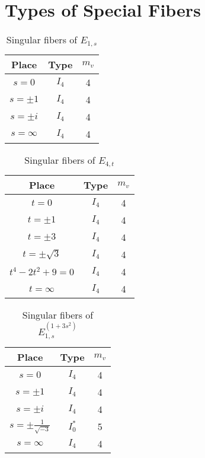 \documentclass[main]{subfiles}
\begin{document}
\chapter{Types of Special Fibers}
\begin{table}[h]
    \centering
    \caption{Singular fibers of $E_{1,s}$}
    \begin{tabular}{|c|c|c|}
        \hline
        Place      & Type  & $m_v$ \\
        \hline
        $s=0$      & $I_4$ & 4     \\
        $s=\pm 1$  & $I_4$ & 4     \\
        $s=\pm i$  & $I_4$ & 4     \\
        $s=\infty$ & $I_4$ & 4     \\
        \hline
    \end{tabular}
\end{table}

\begin{table}[h]
    \centering
    \caption{Singular fibers of $E_{4,t}$}
    \begin{tabular}{|c|c|c|}
        \hline
        Place            & Type  & $m_v$ \\
        \hline
        $t=0$            & $I_4$ & 4     \\
        $t=\pm 1$        & $I_4$ & 4     \\
        $t=\pm 3$        & $I_4$ & 4     \\
        $t=\pm \sqrt{3}$ & $I_4$ & 4     \\
        $t^4-2t^2+9=0$   & $I_4$ & 4     \\
        $t=\infty$       & $I_4$ & 4     \\
        \hline
    \end{tabular}
\end{table}

\begin{table}[h]
  \centering
  \caption{Singular fibers of $E_{1,s}^{(1 + 3s^{2})}$}
  \begin{tabular}{|c|c|c|}
      \hline
      Place                        & Type    & $m_v$ \\
      \hline
      $s=0$                        & $I_4$   & 4     \\
      $s=\pm 1$                    & $I_4$   & 4     \\
      $s=\pm i$                    & $I_4$   & 4     \\
      $s=\pm \frac{1}{\sqrt{-3}} $ & $I_0^*$ & 5     \\
      $s=\infty$                   & $I_4$   & 4     \\
      \hline
  \end{tabular}
\end{table}
\end{document}
